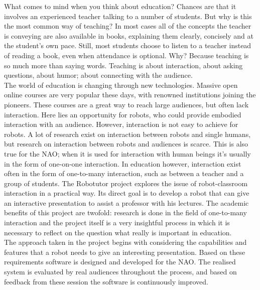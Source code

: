 What comes to mind when you think about education? Chances are that it involves an experienced teacher talking to a number of students. But why is this the most common way of teaching? In most cases all of the concepts the teacher is conveying are also available in books, explaining them clearly, concisely and at the student's own pace. Still, most students choose to listen to a teacher instead of reading a book, even when attendance is optional. Why? Because teaching is so much more than saying words. Teaching is about interaction, about asking questions, about humor; about connecting with the audience.\\

The world of education is changing through new technologies. Massive open online courses are very popular these days, with renowned institutions joining the pioneers. These courses are a great way to reach large audiences, but often lack interaction. Here lies an opportunity for robots, who could provide embodied interaction with an audience. However, interaction is not easy to achieve for robots. A lot of research exist on interaction between robots and single humans, but research on interaction between robots and audiences is scarce. This is also true for the NAO; when it is used for interaction with human beings it's usually in the form of one-on-one interaction. In education however, interaction exist often in the form of one-to-many interaction, such as between a teacher and a group of students. The Robotutor project explores the issue of robot-classroom interaction in a practical way. Its direct goal is to develop a robot that can give an interactive presentation to assist a professor with his lectures. The academic benefits of this project are twofold: research is done in the field of one-to-many interaction and the project itself is a very insightful process in which it is necessary to reflect on the question what really is important in education.\\

The approach taken in the project begins with considering the capabilities and features that a robot needs to give an interesting presentation. Based on these requirements software is designed and developed for the NAO. The realised system is evaluated by real audiences throughout the process, and based on feedback from these session the software is continuously improved.

